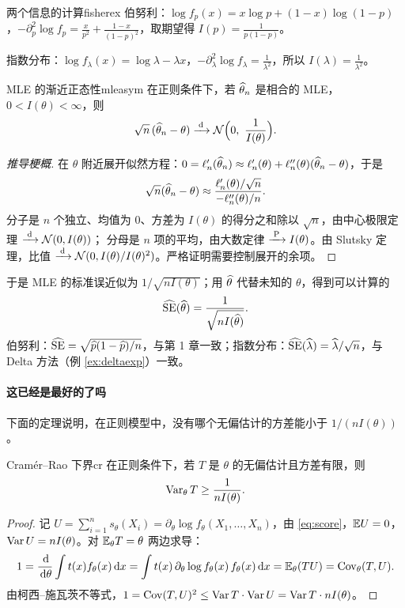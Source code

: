 \begin{example}{两个信息的计算}{fisherex}
伯努利：$\log f_p(x)=x\log p+(1-x)\log(1-p)$，$-\partial_p^2\log f_p=\frac x{p^2}+\frac{1-x}{(1-p)^2}$，取期望得 $I(p)=\frac1{p(1-p)}$。

指数分布：$\log f_\lambda(x)=\log\lambda-\lambda x$，$-\partial_\lambda^2\log f_\lambda=\frac1{\lambda^2}$，所以 $I(\lambda)=\frac1{\lambda^2}$。
\end{example}

\begin{theorem}{MLE 的渐近正态性}{mleasym}
在正则条件下，若 $\widehat{\theta}_n$ 是相合的 MLE，$0<I(\theta)<\infty$，则
\[
\sqrt n\,(\hatt\theta_n-\theta)\tod\N\Big(0,\ \frac{1}{I(\theta)}\Big).
\]
\end{theorem}
\begin{proof}[推导梗概]
在 $\theta$ 附近展开似然方程：$0=\ell_n'(\widehat{\theta}_n)\approx\ell_n'(\theta)+\ell_n''(\theta)(\widehat{\theta}_n-\theta)$，于是
\[
\sqrt n(\widehat{\theta}_n-\theta)\approx\frac{\ell_n'(\theta)/\sqrt n}{-\ell_n''(\theta)/n}.
\]
分子是 $n$ 个独立、均值为 $0$、方差为 $I(\theta)$ 的得分之和除以 $\sqrt n$，由中心极限定理 $\xrightarrow{\;\mathrm{d}\;}\mathcal{N}(0,I(\theta))$；
分母是 $n$ 项的平均，由大数定律 $\xrightarrow{\;\mathrm{P}\;} I(\theta)$。由 Slutsky 定理，比值 $\xrightarrow{\;\mathrm{d}\;}\mathcal{N}(0,I(\theta)/I(\theta)^2)$。严格证明需要控制展开的余项。
\end{proof}

于是 MLE 的标准误近似为 $1/\sqrt{nI(\theta)}$；用 $\widehat{\theta}$ 代替未知的 $\theta$，得到可以计算的
\[
\widehat{\operatorname{SE}}(\widehat{\theta})=\frac{1}{\sqrt{nI(\widehat{\theta})}} .
\]
伯努利：$\widehat{\operatorname{SE}}=\sqrt{\widehat{p}(1-\widehat{p})/n}$，与第 1 章一致；指数分布：$\widehat{\operatorname{SE}}(\widehat{\lambda})=\widehat{\lambda}/\sqrt n$，与 Delta 方法（例 \ref{ex:deltaexp}）一致。

\paragraph{这已经是最好的了吗}
下面的定理说明，在正则模型中，没有哪个无偏估计的方差能小于 $1/(nI(\theta))$。

\begin{theorem}{Cramér–Rao 下界}{cr}
在正则条件下，若 $T$ 是 $\theta$ 的无偏估计且方差有限，则
\[
\operatorname{Var}_\theta T\ge\frac{1}{nI(\theta)} .
\]
\end{theorem}
\begin{proof}
记 $U=\sum_{i=1}^ns_\theta(X_i)=\partial_\theta\log f_\theta(X_1,\dots,X_n)$，由 \eqref{eq:score}，$\mathbb{E} U=0$，$\operatorname{Var} U=nI(\theta)$。对 $\mathbb{E}_\theta T=\theta$ 两边求导：
\[
1=\frac{\,\mathrm{d}}{\,\mathrm{d}\theta}\int t(x)f_\theta(x)\,\mathrm{d} x=\int t(x)\,\partial_\theta\log f_\theta(x)\,f_\theta(x)\,\mathrm{d} x=\mathbb{E}_\theta(TU)=\operatorname{Cov}_\theta(T,U).
\]
由柯西–施瓦茨不等式，$1=\operatorname{Cov}(T,U)^2\le\operatorname{Var} T\cdot\operatorname{Var} U=\operatorname{Var} T\cdot nI(\theta)$。
\end{proof}

